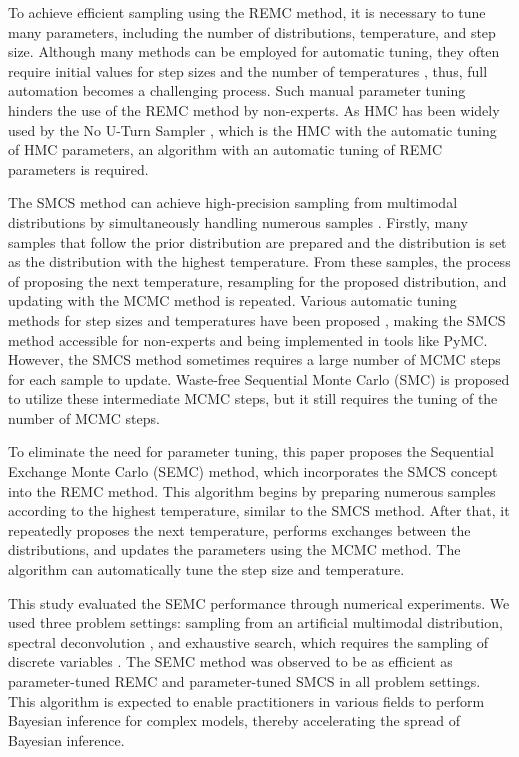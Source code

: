 \documentclass[12pt]{article}
\begin{document}
To achieve efficient sampling using the REMC method, it is necessary to tune many parameters, including the number of distributions, temperature, and step size.
Although many methods can be employed for automatic tuning, they often require initial values for step sizes \cite{andrieu2008tutorial} and the number of temperatures \cite{vousden2016dynamic}, thus, full automation becomes a challenging process.
Such manual parameter tuning hinders the use of the REMC method by non-experts. 
As HMC has been widely used by the No U-Turn Sampler \cite{hoffman2014no}, which is the HMC with the automatic tuning of HMC parameters, an algorithm with an automatic tuning of REMC parameters is required.

The SMCS method can achieve high-precision sampling from multimodal distributions by simultaneously handling numerous samples \cite{neal2001annealed, chopin2002sequential, del2006sequential}.
Firstly, many samples that follow the prior distribution are prepared and the distribution is set as the distribution with the highest temperature. 
From these samples, the process of proposing the next temperature, resampling for the proposed distribution, and updating with the MCMC method is repeated.
Various automatic tuning methods for step sizes and temperatures have been proposed \cite{fearnhead2013adaptive,schafer2013sequential,beskos2016convergence}, making the SMCS method accessible for non-experts and being implemented in tools like PyMC.
However, the SMCS method sometimes requires a large number of MCMC steps for each sample to update.
Waste-free Sequential Monte Carlo (SMC) \cite{dau2022waste} is proposed to utilize these intermediate MCMC steps, but it still requires the tuning of the number of MCMC steps.

To eliminate the need for parameter tuning, this paper proposes the Sequential Exchange Monte Carlo (SEMC) method, which incorporates the SMCS concept into the REMC method.
This algorithm begins by preparing numerous samples according to the highest temperature, similar to the SMCS method.
After that, it repeatedly proposes the next temperature, performs exchanges between the distributions, and updates the parameters using the MCMC method.
The algorithm can automatically tune the step size and temperature. \par

This study evaluated the SEMC performance through numerical experiments. 
We used three problem settings: sampling from an artificial multimodal distribution, spectral deconvolution \cite{Nagata2012}, and exhaustive search, which requires the sampling of discrete variables \cite{nagata2015exhaustive,igarashi2018exhaustive}.
The SEMC method was observed to be as efficient as parameter-tuned REMC and parameter-tuned SMCS in all problem settings.
This algorithm is expected to enable practitioners in various fields to perform Bayesian inference for complex models, thereby accelerating the spread of Bayesian inference.\par
\end{document}
